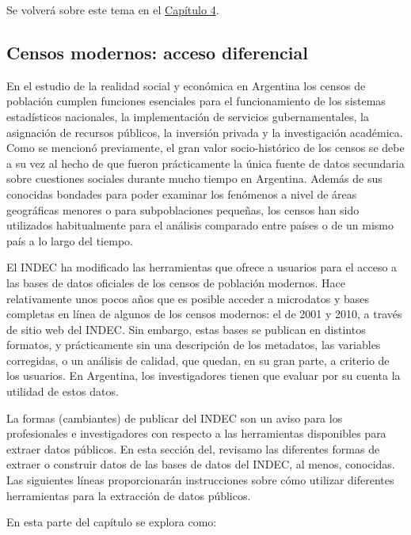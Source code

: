 \documentclass[
]{article}
\begin{document}
Se volverá sobre este tema en el \protect\hyperlink{ocupacion}{Capítulo 4}.

\hypertarget{censos2}{%
\subsection{Censos modernos: acceso diferencial}\label{censos2}}

En el estudio de la realidad social y económica en Argentina los censos de población cumplen funciones esenciales para el funcionamiento de los sistemas estadísticos nacionales, la implementación de servicios gubernamentales, la asignación de recursos públicos, la inversión privada y la investigación académica. Como se mencionó previamente, el gran valor socio-histórico de los censos se debe a su vez al hecho de que fueron prácticamente la única fuente de datos secundaria sobre cuestiones sociales durante mucho tiempo en Argentina. Además de sus conocidas bondades para poder examinar los fenómenos a nivel de áreas geográficas menores o para subpoblaciones pequeñas, los censos han sido utilizados habitualmente para el análisis comparado entre países o de un mismo país a lo largo del tiempo.

El INDEC ha modificado las herramientas que ofrece a usuarios para el acceso a las bases de datos oficiales de los censos de población modernos. Hace relativamente unos pocos años que es posible acceder a microdatos y bases completas en línea de algunos de los censos modernos: el de 2001 y 2010, a través de sitio web del INDEC. Sin embargo, estas bases se publican en distintos formatos, y prácticamente sin una descripción de los metadatos, las variables corregidas, o un análisis de calidad, que quedan, en su gran parte, a criterio de los usuarios. En Argentina, los investigadores tienen que evaluar por su cuenta la utilidad de estos datos.

La formas (cambiantes) de publicar del INDEC son un aviso para los profesionales e investigadores con respecto a las herramientas disponibles para extraer datos públicos. En esta sección del, revisamo las diferentes formas de extraer o construir datos de las bases de datos del INDEC, al menos, conocidas. Las siguientes líneas proporcionarán instrucciones sobre cómo utilizar diferentes herramientas para la extracción de datos públicos.

En esta parte del capítulo se explora como:
\end{document}
